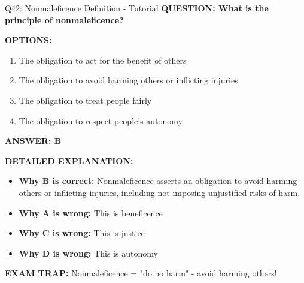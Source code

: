 \documentclass[8pt]{beamer}
\begin{document}
	\begin{frame}{Q42: Nonmaleficence Definition - Tutorial}
		\fontsize{6.5}{7.5}\selectfont
		\textbf{QUESTION: What is the principle of nonmaleficence?}
		
		\vspace{0.1cm}
		\textbf{OPTIONS:}
		\begin{enumerate}
			\item The obligation to act for the benefit of others
			\item The obligation to avoid harming others or inflicting injuries
			\item The obligation to treat people fairly
			\item The obligation to respect people's autonomy
		\end{enumerate}
		
		\vspace{0.1cm}
		\textcolor{myblue}{\textbf{ANSWER: B}}
		
		\vspace{0.1cm}
		\textbf{DETAILED EXPLANATION:}
		\begin{itemize}
			\item \textbf{Why B is correct:} Nonmaleficence asserts an obligation to avoid harming others or inflicting injuries, including not imposing unjustified risks of harm.
			\item \textbf{Why A is wrong:} This is beneficence
			\item \textbf{Why C is wrong:} This is justice
			\item \textbf{Why D is wrong:} This is autonomy
		\end{itemize}
		
		\textcolor{myred}{\textbf{EXAM TRAP:}} Nonmaleficence = \textcolor{myblue}{"do no harm"} - avoid harming others!
	\end{frame}
	
\end{document}
